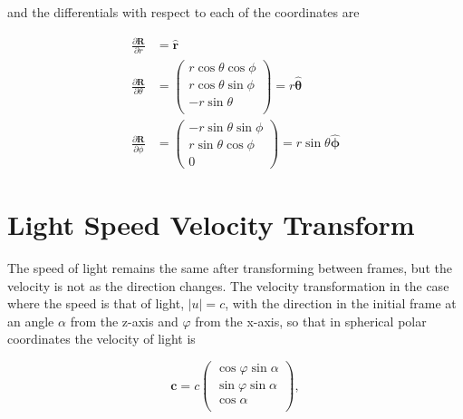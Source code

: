 and the differentials with respect to each of the coordinates are

\begin{equation}
	\begin{aligned}
		\frac{\partial\mathbf{R}}{\partial r}      & = \mathbf{\hat{\text{$r$}}} \\
		\frac{\partial\mathbf{R}}{\partial \theta} & =
		\begin{pmatrix}
			r \cos\theta \cos\phi \\
			r \cos\theta \sin\phi \\
			-r \sin\theta         \\
		\end{pmatrix}
		=r\mathbf{\hat{\text{$\theta$}}}                                         \\
		\frac{\partial\mathbf{R}}{\partial \phi}   & =
		\begin{pmatrix}
			-r \sin\theta \sin\phi \\
			r \sin\theta \cos\phi  \\
			0
		\end{pmatrix}
		= r \sin\theta \mathbf{\hat{\text{$\phi$}}}
	\end{aligned}
\end{equation}

\section{Light Speed Velocity Transform}

The speed of light remains the same after transforming between frames, but the velocity is not as the direction changes. The velocity transformation in the case where the speed is that of light, $|u|=c$, with the direction in the initial frame at an angle $\alpha$ from the z-axis and $\varphi$ from the x-axis, so that in spherical polar coordinates the velocity of light is

\begin{equation}
	\mathbf{c} = c
	\begin{pmatrix}
		\cos{\varphi}\sin{\alpha} \\
		\sin{\varphi}\sin{\alpha} \\
		\cos{\alpha}              \\
	\end{pmatrix},
\end{equation}

